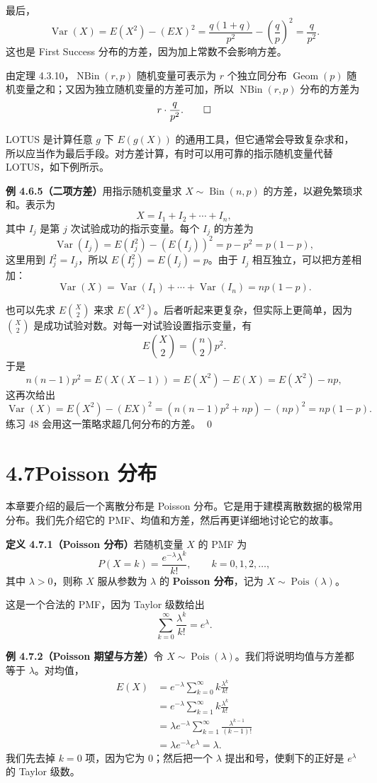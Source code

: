 \documentclass[UTF8, 12pt, fontset=fandol, oneside]{ctexart}
\begin{document}
最后，
\[
  \operatorname{Var}(X)
  =E(X^2)-(EX)^2
  =\frac{q(1+q)}{p^2}-\left(\frac{q}{p}\right)^2
  =\frac{q}{p^2}.
\]
这也是 First Success 分布的方差，因为加上常数不会影响方差。

由定理 4.3.10，$\operatorname{NBin}(r,p)$ 随机变量可表示为 $r$ 个独立同分布 $\operatorname{Geom}(p)$ 随机变量之和；又因为独立随机变量的方差可加，所以 $\operatorname{NBin}(r,p)$ 分布的方差为
\[
  r\cdot\frac{q}{p^2}. \qed
\]

LOTUS 是计算任意 $g$ 下 $E(g(X))$ 的通用工具，但它通常会导致复杂求和，所以应当作为最后手段。对方差计算，有时可以用可靠的指示随机变量代替 LOTUS，如下例所示。

\noindent\textbf{例 4.6.5（二项方差）}\quad 用指示随机变量求 $X\sim\operatorname{Bin}(n,p)$ 的方差，以避免繁琐求和。表示为
\[
  X=I_1+I_2+\cdots+I_n,
\]
其中 $I_j$ 是第 $j$ 次试验成功的指示变量。每个 $I_j$ 的方差为
\[
  \operatorname{Var}(I_j)=E(I_j^2)-(E(I_j))^2=p-p^2=p(1-p),
\]
这里用到 $I_j^2=I_j$，所以 $E(I_j^2)=E(I_j)=p$。由于 $I_j$ 相互独立，可以把方差相加：
\[
  \operatorname{Var}(X)
  =\operatorname{Var}(I_1)+\cdots+\operatorname{Var}(I_n)
  =np(1-p).
\]

也可以先求 $E\binom{X}{2}$ 来求 $E(X^2)$。后者听起来更复杂，但实际上更简单，因为 $\binom{X}{2}$ 是成功试验对数。对每一对试验设置指示变量，有
\[
  E\binom{X}{2}=\binom{n}{2}p^2.
\]
于是
\[
  n(n-1)p^2=E(X(X-1))=E(X^2)-E(X)=E(X^2)-np,
\]
这再次给出
\[
  \operatorname{Var}(X)=E(X^2)-(EX)^2
  =(n(n-1)p^2+np)-(np)^2=np(1-p).
\]
练习 48 会用这一策略求超几何分布的方差。 \qed

\section*{4.7\quad Poisson 分布}

本章要介绍的最后一个离散分布是 Poisson 分布。它是用于建模离散数据的极常用分布。我们先介绍它的 PMF、均值和方差，然后再更详细地讨论它的故事。

\noindent\textbf{定义 4.7.1（Poisson 分布）}\quad 若随机变量 $X$ 的 PMF 为
\[
  P(X=k)=\frac{e^{-\lambda}\lambda^k}{k!},\qquad k=0,1,2,\ldots,
\]
其中 $\lambda>0$，则称 $X$ 服从参数为 $\lambda$ 的 \textbf{Poisson 分布}，记为 $X\sim\operatorname{Pois}(\lambda)$。

这是一个合法的 PMF，因为 Taylor 级数给出
\[
  \sum_{k=0}^{\infty}\frac{\lambda^k}{k!}=e^\lambda.
\]

\noindent\textbf{例 4.7.2（Poisson 期望与方差）}\quad 令 $X\sim\operatorname{Pois}(\lambda)$。我们将说明均值与方差都等于 $\lambda$。对均值，
\[
\begin{aligned}
  E(X)
  &=e^{-\lambda}\sum_{k=0}^{\infty}k\frac{\lambda^k}{k!}\\
  &=e^{-\lambda}\sum_{k=1}^{\infty}k\frac{\lambda^k}{k!}\\
  &=\lambda e^{-\lambda}\sum_{k=1}^{\infty}\frac{\lambda^{k-1}}{(k-1)!}\\
  &=\lambda e^{-\lambda}e^\lambda=\lambda.
\end{aligned}
\]
我们先去掉 $k=0$ 项，因为它为 $0$；然后把一个 $\lambda$ 提出和号，使剩下的正好是 $e^\lambda$ 的 Taylor 级数。
\end{document}

